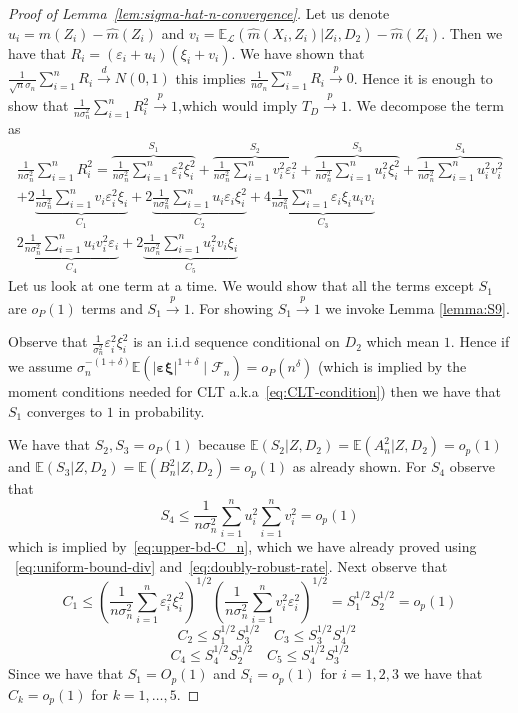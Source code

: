\documentclass[12pt]{article}
\theoremstyle{definition}
\theoremstyle{remark}
\newcommand{\E}{\mathbb E}								%
\newcommand{\srx}{X}									%
\newcommand{\srz}{Z}									%
\newcommand{\law}{\mathcal L}							%
\begin{document}
\begin{proof}[Proof of Lemma~\ref{lem:sigma-hat-n-convergence}]
	
	Let us denote $u_i = m(\srz_i) - \widehat m(\srz_i)$ and $v_i =  \E_{\law}( \widehat m(\srx_i,\srz_i) |\srz_i,D_2) -  \widehat m(\srz_i)$. Then we have that $R_i = (\varepsilon_i + u_i)(\xi_i + v_i)$. We have shown that $\frac{1}{\sqrt n \sigma_n} \sum_{i=1}^n R_i \overset{d}{\to} N(0,1)$ this implies $\frac{1}{n \sigma_n} \sum_{i=1}^n R_i \overset{p}{\to} 0$. Hence it is enough to show that $\frac{1}{n \sigma^2_n} \sum_{i=1}^n R^2_i \overset{p}{\to} 1$,which would imply $T_D \overset{p}{\to} 1$. We decompose the term as
	\begin{gather*}
		\frac{1}{n \sigma^2_n} \sum_{i=1}^n R^2_i = \overbrace{\frac{1}{n\sigma_n^2} \sum_{i=1}^n \varepsilon_i^2\xi^2_i}^{S_1} +  \overbrace{\frac{1}{n\sigma_n^2} \sum_{i=1}^n v_i^2\varepsilon_i^2}^{S_2} + \overbrace{ \frac{1}{n\sigma_n^2} \sum_{i=1}^n u_i^2\xi^2_i}^{S_3} + \overbrace{ \frac{1}{n\sigma_n^2} \sum_{i=1}^n u_i^2v_i^2}^{S_4} \\
		+ 2\underbrace{\frac{1}{n\sigma_n^2} \sum_{i=1}^n v_i\varepsilon_i^2\xi_i}_{C_1} + 2\underbrace{ \frac{1}{n\sigma_n^2} \sum_{i=1}^n u_i \varepsilon_i\xi^2_i}_{C_2} + 4\underbrace{ \frac{1}{n\sigma_n^2} \sum_{i=1}^n \varepsilon_i\xi_iu_iv_i}_{C_3}	\\
		2\underbrace{\frac{1}{n\sigma_n^2} \sum_{i=1}^n u_iv^2_i\varepsilon_i}_{C_4} + 2\underbrace{ \frac{1}{n\sigma_n^2} \sum_{i=1}^n u^2_iv_i \xi_i}_{C_5} 
	\end{gather*}
	Let us look at one term at a time. We would show that all the terms except $S_1$ are $o_P(1)$ terms and $S_1 \overset{p}{\to}  1$. For showing $S_1 \overset{p}{\to} 1$ we invoke Lemma \ref{lemma:S9}.
	
	
	 Observe that $\frac{1}{\sigma^2_n} \varepsilon_i^2\xi_i^2$ is an i.i.d sequence conditional on $D_2$ which mean $1$. Hence if we assume $\sigma_n^{-{(1+\delta)}} \E\left(|\bm\varepsilon\bm\xi|^{1+\delta} \mid \mathcal{F}_n\right) = o_P(n^{\delta})$ (which is implied by the moment conditions needed for CLT a.k.a~\eqref{eq:CLT-condition}) then we have that $S_1$ converges to $1$ in probability.
	
	We have that $S_2,S_3 =o_P(1)$ because $\E(S_2| \srz,D_2) =\E(A_n^2| \srz,D_2)= o_p(1)$ and $\E(S_3| \srz,D_2) = \E(B_n^2| \srz,D_2)= o_p(1)$ as already shown. For $S_4$ observe that 
	$$
	S_4 \leq \frac{1}{n \sigma_n^2} \sum_{i=1}^n u_i^2 \sum_{i=1}^n v_i^2 = o_p(1)
	$$
	which is implied by~\eqref{eq:upper-bd-C_n}, which we have already proved using
	~\eqref{eq:uniform-bound-div} and~\eqref{eq:doubly-robust-rate}.
	Next observe that 
	$$
	C_1 \leq \left(\frac{1}{n \sigma_n^2} \sum_{i=1}^n \varepsilon_i^2\xi_i^2 \right)^{1/2}\left(\frac{1}{n \sigma_n^2} \sum_{i=1}^n  v^2_i \varepsilon^2_i \right)^{1/2} = S_1^{1/2} S_2^{1/2} = o_p(1)
	$$
	$$
	\quad C_2 \leq S_1^{1/2} S_3^{1/2} \quad C_3 \leq S_3^{1/2}S_4^{1/2}
	$$
	$$
	C_4 \leq S_4^{1/2}S_2^{1/2} \quad C_5 \leq S_4^{1/2} S_3^{1/2}
	$$
	Since we have that $S_1 =O_p(1)$ and $S_i = o_p(1)$ for $i=1,2,3$ we have that $C_k = o_p(1)$ for $k = 1,\ldots,5$.
	

\end{proof}
\end{document}
